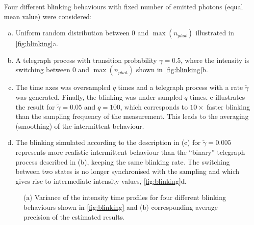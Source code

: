 Four different blinking behaviours with fixed number of emitted photons (equal mean value) were considered: 
%
\begin{enumerate}[(a)]
	\item
	Uniform random distribution between $0$ and $\max(n_{phot})$ illustrated in  \autoref{fig:blinking}a. 
	\item
	A telegraph process with transition probability $\gamma=0.5$, where the intensity is switching between $0$ and $\max(n_{phot})$ shown in \autoref{fig:blinking}b.
	\item
	The time axes was oversampled $q$ times and a telegraph process with a rate $\tilde{\gamma}$ was generated. Finally, the blinking was under-sampled $q$ times. c illustrates the result for $\tilde{\gamma}=0.05$ and $q=100$, which corresponds to $10\times$ faster blinking than the sampling frequency of the measurement. This leads to the averaging (smoothing) of the intermittent behaviour.
	\item
	The blinking simulated according to the description in (c) for $\tilde{\gamma}=0.005$ represents more realistic intermittent behaviour than the ``binary'' telegraph process described in (b), keeping the same blinking rate. The switching between two states is no longer synchronised with the sampling and which gives rise to intermediate intensity values, \autoref{fig:blinking}d. 
\end{enumerate}
	
\begin{figure}[!h]
	\centering
	\newcommand{\sizefig}{.40}
	\caption{(a) Variance of the intensity time profiles for four different blinking behaviours shown in \autoref{fig:blinking} and (b) corresponding average precision of the estimated results.}		
\end{figure}

